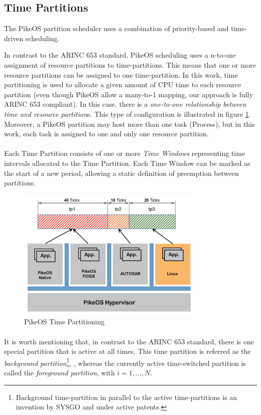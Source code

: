 \subsection{Time Partitions}
The PikeOS partition scheduler uses a combination of priority-based and time-driven scheduling. 
\par In contrast to the ARINC 653 standard, PikeOS scheduling uses a n-to-one assignment of resource partitions to time-partitions. This means that one or more resource partitions can be assigned to one time-partition. In this work, time partitioning is used to allocate a given amount of CPU time to each resource partition (even though PikeOS allow  a many-to-1 mapping, our approach is fully ARINC 653 compliant). In this case, there is a \emph{one-to-one relationship between time and resource partition}s. This type of configuration is illustrated in figure \ref{fig:TimePartitioning}. Moreover, a PikeOS partition may host more than one task (Process), but in this work, each task is assigned to one and only one resource partition.
\paragraph{} Each Time Partition consists of one or more \emph{Time Windows} representing time intervals allocated to the Time Partition. Each Time Window can be marked as the start of a new period, allowing a static definition of preemption between partitions.

\begin{figure}[htbp] 
\centering    
\includegraphics[width=0.8\textwidth]{TimePartitioning}
\caption{PikeOS Time Partitioning}
\label{fig:TimePartitioning}
\end{figure}

\paragraph{}It is worth mentioning that, in contrast to the ARINC 653 standard, there is one special partition that is active at all times. This time partition is referred as the \emph{background partition}\footnote{Background time-partition in parallel to the active
time-partitions is an invention by SYSGO and under active patents.}, , whereas the currently active time-switched partition is called the \emph{foreground partition},  with $i={1,...,N}$.


